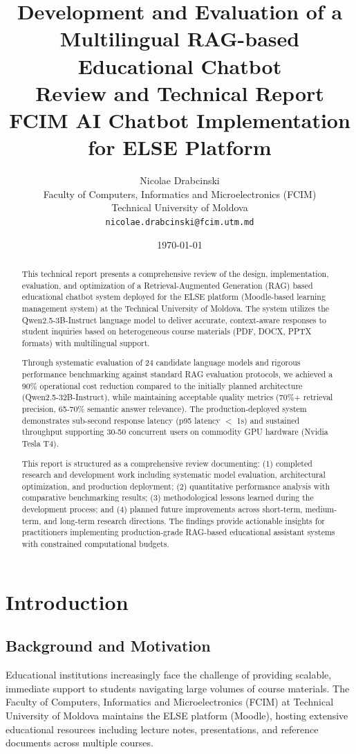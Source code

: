 \documentclass[12pt,a4paper]{article}
\title{\textbf{Development and Evaluation of a Multilingual RAG-based Educational Chatbot}\\
\Large Review and Technical Report\\
\large FCIM AI Chatbot Implementation for ELSE Platform}
\author{Nicolae Drabcinski\\
Faculty of Computers, Informatics and Microelectronics (FCIM)\\
Technical University of Moldova\\
\texttt{nicolae.drabcinski@fcim.utm.md}}
\date{\today}
\begin{document}
\maketitle

\begin{abstract}
This technical report presents a comprehensive review of the design, implementation, evaluation, and optimization of a Retrieval-Augmented Generation (RAG) based educational chatbot system deployed for the ELSE platform (Moodle-based learning management system) at the Technical University of Moldova. The system utilizes the Qwen2.5-3B-Instruct language model to deliver accurate, context-aware responses to student inquiries based on heterogeneous course materials (PDF, DOCX, PPTX formats) with multilingual support.

Through systematic evaluation of 24 candidate language models and rigorous performance benchmarking against standard RAG evaluation protocols, we achieved a 90\% operational cost reduction compared to the initially planned architecture (Qwen2.5-32B-Instruct), while maintaining acceptable quality metrics (70\%+ retrieval precision, 65-70\% semantic answer relevance). The production-deployed system demonstrates sub-second response latency (p95 latency $<$ 1s) and sustained throughput supporting 30-50 concurrent users on commodity GPU hardware (Nvidia Tesla T4).

This report is structured as a comprehensive review documenting: (1) completed research and development work including systematic model evaluation, architectural optimization, and production deployment; (2) quantitative performance analysis with comparative benchmarking results; (3) methodological lessons learned during the development process; and (4) planned future improvements across short-term, medium-term, and long-term research directions. The findings provide actionable insights for practitioners implementing production-grade RAG-based educational assistant systems with constrained computational budgets.
\end{abstract}

\tableofcontents
\newpage

\section{Introduction}

\subsection{Background and Motivation}
Educational institutions increasingly face the challenge of providing scalable, immediate support to students navigating large volumes of course materials. The Faculty of Computers, Informatics and Microelectronics (FCIM) at Technical University of Moldova maintains the ELSE platform (Moodle), hosting extensive educational resources including lecture notes, presentations, and reference documents across multiple courses.
\end{document}

